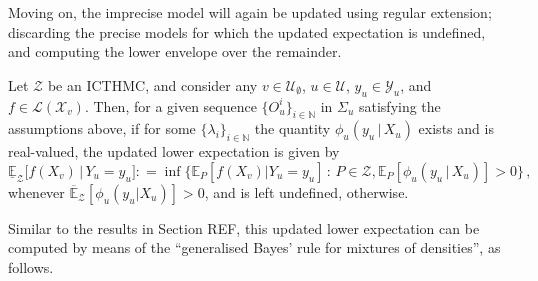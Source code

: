 \documentclass[twoside,11pt]{article}
\newcommand{\nats}{\mathbb{N}}
\newcommand{\states}{\mathcal{X}}
\newcommand{\observs}{\mathcal{Y}}
\newcommand{\gambles}{\mathcal{L}}
\newcommand{\coloneqq}{:\!=}
\begin{document}

Moving on, the imprecise model will again be updated using regular extension; discarding the precise models for which the updated expectation is undefined, and computing the lower envelope over the remainder.
\begin{definition}
Let $\mathcal{Z}$ be an ICTHMC, and consider any $v\in\mathcal{U}_\emptyset$, $u\in\mathcal{U}$, $y_u\in\observs_u$, and $f\in\gambles(\states_v)$. Then, for a given sequence $\{O_u^i\}_{i\in\nats}$ in $\Sigma_u$ satisfying the assumptions above, if for some $\{\lambda_i\}_{i\in\nats}$ the quantity $\phi_u(y_u\,\vert\,X_u)$ exists and is real-valued, the updated lower expectation is given by 
\begin{equation*}
\underline{\mathbb{E}}_{\mathcal{Z}}\bigl[f(X_v)\,\vert\,Y_u = y_u\bigr] \coloneqq \inf\{\mathbb{E}_P[f(X_v)\vert Y_u=y_u]\,:\,P\in\mathcal{Z}, \mathbb{E}_P[\phi_u(y_u\,\vert\,X_u)]>0\}\,,
\end{equation*}
whenever $\overline{\mathbb{E}}_\mathcal{Z}[\phi_u(y_u\vert X_u)] >0$, and is left undefined, otherwise.
\end{definition}

Similar to the results in Section REF, this updated lower expectation can be computed by means of the ``generalised Bayes' rule for mixtures of densities'', as follows.
\end{document}
